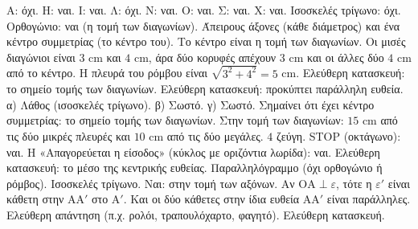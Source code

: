  Α: όχι. Η: ναι. Ι: ναι. Λ: όχι. Ν: ναι. Ο: ναι. Σ: ναι. Χ: ναι.
 Ισοσκελές τρίγωνο: όχι. Ορθογώνιο: ναι (η τομή των διαγωνίων).
 Άπειρους άξονες (κάθε διάμετρος) και ένα κέντρο συμμετρίας (το κέντρο του).
 Το κέντρο είναι η τομή των διαγωνίων. Οι μισές διαγώνιοι είναι $3$ cm και $4$ cm, άρα δύο κορυφές απέχουν $3$ cm και οι άλλες δύο $4$ cm από το κέντρο. Η πλευρά του ρόμβου είναι $\sqrt{3^2+4^2}=5$ cm.
 Ελεύθερη κατασκευή: το σημείο τομής των διαγωνίων.
 Ελεύθερη κατασκευή: προκύπτει παράλληλη ευθεία.
 α) Λάθος (ισοσκελές τρίγωνο). β) Σωστό. γ) Σωστό.
 Σημαίνει ότι έχει κέντρο συμμετρίας: το σημείο τομής των διαγωνίων.
 Στην τομή των διαγωνίων: $15$ cm από τις δύο μικρές πλευρές και $10$ cm από τις δύο μεγάλες.
 $4$ ζεύγη.
 STOP (οκτάγωνο): ναι. Η «Απαγορεύεται η είσοδος» (κύκλος με οριζόντια λωρίδα): ναι.
 Ελεύθερη κατασκευή: το μέσο της κεντρικής ευθείας.
 Παραλληλόγραμμο (όχι ορθογώνιο ή ρόμβος).
 Ισοσκελές τρίγωνο.
 Ναι: στην τομή των αξόνων.
 Αν $\mathrm{ΟΑ}\perp\varepsilon$, τότε η $\varepsilon'$ είναι κάθετη στην $\mathrm{ΑΑ}'$ στο $\mathrm{Α}'$. Και οι δύο κάθετες στην ίδια ευθεία $\mathrm{ΑΑ}'$ είναι παράλληλες.
 Ελεύθερη απάντηση (π.χ. ρολόι, τραπουλόχαρτο, φαγητό).
 Ελεύθερη κατασκευή.
